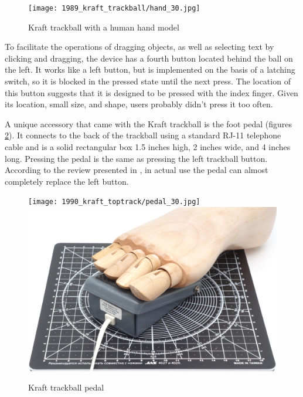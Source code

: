 \documentclass[11pt, a4paper]{article}
\begin{document}
\begin{figure}[h]
    \centering
    \texttt{[image: 1989\_kraft\_trackball/hand\_30.jpg]}
    \caption{Kraft trackball with a human hand model}
    \label{fig:KraftHand}
\end{figure}

To facilitate the operations of dragging objects, as well as selecting text by clicking and dragging, the device has a fourth button located behind the ball on the left. It works like a left button, but is implemented on the basis of a latching switch, so it is blocked in the pressed state until the next press. The location of this button suggests that it is designed to be pressed with the index finger. Given its location, small size, and shape, users probably didn't press it too often.

A unique accessory that came with the Kraft trackball is the foot pedal (figures \ref{fig:KraftPedal}). It connects to the back of the trackball using a standard RJ-11 telephone cable and is a solid rectangular box 1.5 inches high, 2 inches wide, and 4 inches long. Pressing the pedal is the same as pressing the left trackball button. According to the review presented in \cite{kraftwithpedal}, in actual use the pedal can almost completely replace the left button.

\begin{figure}[h]
    \centering
    \texttt{[image: 1990\_kraft\_toptrack/pedal\_30.jpg]} \hfill 
    \includegraphics[scale=0.22]{1990_kraft_toptrack/pedal_foot_30.jpg}
    \caption{Kraft trackball pedal}
    \label{fig:KraftPedal}
\end{figure}
\end{document}
